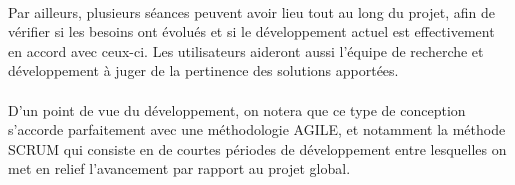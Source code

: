 \paragraph{}Par ailleurs, plusieurs séances peuvent avoir lieu tout au long du projet, afin de vérifier si les besoins ont évolués et si le développement actuel est effectivement en accord avec ceux-ci. Les utilisateurs aideront aussi l'équipe de recherche et développement à juger de la pertinence des solutions apportées.
\paragraph{}
D'un point de vue du développement, on notera que ce type de conception s'accorde parfaitement avec une méthodologie AGILE, et notamment la méthode SCRUM qui consiste en de courtes périodes de développement entre lesquelles on met en relief l'avancement par rapport au projet global.
